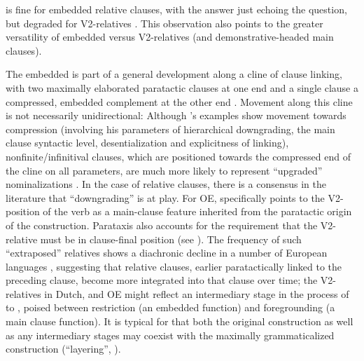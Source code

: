 \documentclass[output=paper,colorlinks,citecolor=brown]{langscibook}
\begin{document}
 is fine for embedded relative clauses, with the answer just echoing the question, but degraded for V2-relatives \citep[130]{Gärtner2001}. This observation also points to the greater versatility of embedded versus V2-relatives (and demon\-strative-headed main clauses).

The embedded  is part of a general development along a cline of clause linking, with two maximally elaborated paratactic clauses at one end and a single clause a compressed, embedded complement at the other end \citep{Lehmann1988}. Movement along this cline is not necessarily unidirectional: Although \linebreak[4]\citeauthor{Lehmann1988}'s examples show movement towards compression (involving his parameters of hierarchical downgrading, the main clause syntactic level, desentialization and explicitness of linking), nonfinite/infinitival clauses, which are positioned towards the compressed end of the cline on all parameters, are much more likely to represent “upgraded” nominalizations \citep{Los2007}. In the case of relative clauses, there is a consensus in the literature that “downgrading” is at play. For OE, \citet[261]{Mitchell1985} specifically points to the V2-position of the verb as a main-clause feature inherited from the paratactic origin of the construction. Parataxis also accounts for the requirement that the V2-relative must be in clause-final position (see ). The frequency of such “extraposed” relatives shows a diachronic decline in a number of European languages \citep{Wallenberg2016}, suggesting that relative clauses, earlier paratactically linked to the preceding clause, become more integrated into that clause over time; the V2-relatives in Dutch,  and OE might reflect an intermediary stage in the process of  to , poised between restriction (an embedded function) and foregrounding (a main clause function). It is typical for  that both the original construction as well as any intermediary stages may coexist with the maximally grammaticalized construction (“layering”, \citealt[106]{HopperTraugott2003}).
\end{document}
